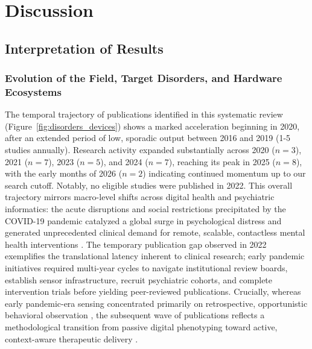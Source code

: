 
\section{Discussion}
\label{sec:discussion}

\subsection{Interpretation of Results}

\subsubsection{Evolution of the Field, Target Disorders, and Hardware Ecosystems}

The temporal trajectory of publications identified in this systematic review (Figure~\ref{fig:disorders_devices}) shows a marked acceleration beginning in 2020, after an extended period of low, sporadic output between 2016 and 2019 (1-5 studies annually). Research activity expanded substantially across 2020 ($n = 3$), 2021 ($n = 7$), 2023 ($n = 5$), and 2024 ($n = 7$), reaching its peak in 2025 ($n = 8$), with the early months of 2026 ($n = 2$) indicating continued momentum up to our search cutoff. Notably, no eligible studies were published in 2022. This overall trajectory mirrors macro-level shifts across digital health and psychiatric informatics: the acute disruptions and social restrictions precipitated by the COVID-19 pandemic catalyzed a global surge in psychological distress \cite{santomauro2021covid19depression, chekole2021covidmentalhealth} and generated unprecedented clinical demand for remote, scalable, contactless mental health interventions \cite{santomauro2021covid19depression, chekole2021covidmentalhealth}. The temporary publication gap observed in 2022 exemplifies the translational latency inherent to clinical research; early pandemic initiatives required multi-year cycles to navigate institutional review boards, establish sensor infrastructure, recruit psychiatric cohorts, and complete intervention trials before yielding peer-reviewed publications. Crucially, whereas early pandemic-era sensing concentrated primarily on retrospective, opportunistic behavioral observation \cite{sanudo2020covidactivity}, the subsequent wave of publications reflects a methodological transition from passive digital phenotyping toward active, context-aware therapeutic delivery \cite{van2025beyond, nahum2025just}.

